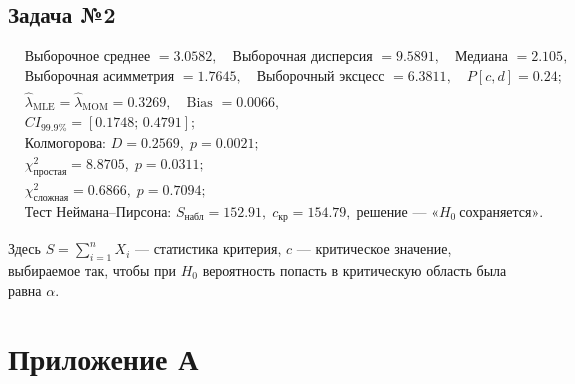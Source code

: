 \documentclass[areasetadvanced]{scrartcl}
\begin{document}
\subsection*{Задача №2}
\[
\begin{aligned}
&\text{Выборочное среднее } = 3.0582,\quad
 \text{Выборочная дисперсия } = 9.5891,\quad
 \text{Медиана } = 2.105,\\[2pt]
&\text{Выборочная асимметрия } = 1.7645,\quad
 \text{Выборочный эксцесс } = 6.3811,\quad
 P[c,d]=0.24;\\[6pt]
&\hat{\lambda}_{\text{MLE}} = \hat{\lambda}_{\text{MOM}} = 0.3269,\quad
 \text{Bias } = 0.0066,\\
&CI_{99.9\%} = [0.1748;\,0.4791];\\[6pt]
&\text{Колмогорова: } D = 0.2569,\; p = 0.0021;\\
&\chi^{2}_{\text{простая}} = 8.8705,\; p = 0.0311;\\
&\chi^{2}_{\text{сложная}}  = 0.6866,\; p = 0.7094;\\[6pt]
&\text{Тест Неймана–Пирсона: } S_{\text{набл}} = 152.91,\;
  c_{\text{кр}} = 154.79,\;
  \text{решение — } \text{«}H_0\ \text{сохраняется»}.
\end{aligned}
\]

Здесь \(S = \sum_{i=1}^{n}X_i\) — статистика критерия,  
\(c\) — критическое значение, выбираемое так, чтобы при \(H_0\)
вероятность попасть в критическую область была равна \(\alpha\).

\newpage
\section*{Приложение А}
\end{document}
